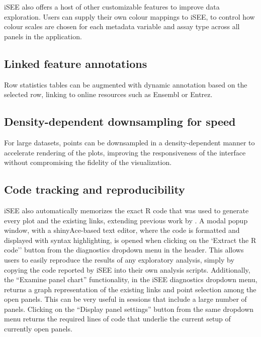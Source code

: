 \documentclass[10pt,a4paper,twocolumn]{article}
\let\cite\citep
\begin{document}
iSEE also offers a host of other customizable features to improve data exploration.
Users can supply their own colour mappings to iSEE, to control how colour scales are chosen for each metadata variable and assay type across all panels in the application.

\subsection*{Linked feature annotations}

Row statistics tables can be augmented with dynamic annotation based on the selected row, linking to online resources such as Ensembl or Entrez. %

\subsection*{Density-dependent downsampling for speed}

For large datasets, points can be downsampled in a density-dependent manner to accelerate rendering of the plots, improving the responsiveness of the interface without compromising the fidelity of the visualization.

\subsection*{Code tracking and reproducibility}

iSEE also automatically memorizes the exact R code that was used to generate every plot and the existing links, extending previous work by \cite{marini2016interrepro}. A modal popup window, with a shinyAce-based text editor, where the code is formatted and displayed with syntax highlighting, is opened when clicking on the `Extract the R code'' button from the diagnostics dropdown menu in the header.
This allows users to easily reproduce the results of any exploratory analysis, simply by copying the code reported by iSEE into their own analysis scripts.
Additionally, the ``Examine panel chart'' functionality, in the iSEE diagnostics dropdown menu, returns a graph representation of the existing links and point selection among the open panels. This can be very useful in sessions that include a large number of panels.
Clicking on the ``Display panel settings'' button from the same dropdown menu returns the required lines of code that underlie the current setup of currently open panels.
\end{document}
